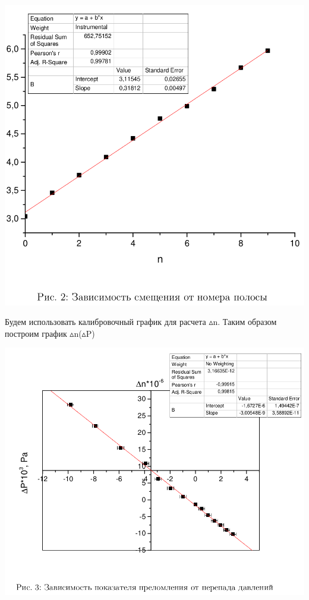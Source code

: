 \documentclass[a4paper,12pt]{article} %
\begin{document}
\begin{center}
    \includegraphics[scale=0.6]{pic2}
\end{center}

Будем использовать калибровочный график для расчета $\vartriangle$n. Таким образом построим график $\vartriangle$n($\vartriangle$P)

\begin{center}
    \includegraphics[scale=0.7]{pic3}
\end{center}
\end{document}
